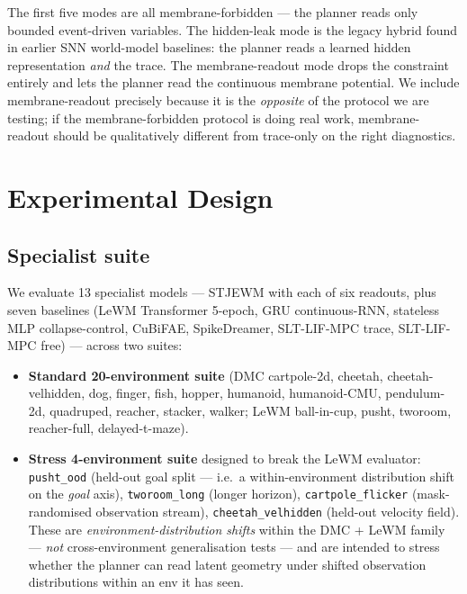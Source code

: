 \documentclass{article}
\begin{document}
The first five modes are all membrane-forbidden --- the planner reads only bounded event-driven variables. The hidden-leak mode is the legacy hybrid found in earlier SNN world-model baselines: the planner reads a learned hidden representation \emph{and} the trace. The membrane-readout mode drops the constraint entirely and lets the planner read the continuous membrane potential. We include membrane-readout precisely because it is the \emph{opposite} of the protocol we are testing; if the membrane-forbidden protocol is doing real work, membrane-readout should be qualitatively different from trace-only on the right diagnostics.

\section{Experimental Design}

\subsection{Specialist suite}

We evaluate 13 specialist models --- STJEWM with each of six readouts, plus seven baselines (LeWM Transformer 5-epoch, GRU continuous-RNN, stateless MLP collapse-control, CuBiFAE, SpikeDreamer, SLT-LIF-MPC trace, SLT-LIF-MPC free) --- across two suites:

\begin{itemize}
\item \textbf{Standard 20-environment suite} (DMC cartpole-2d, cheetah, cheetah-velhidden, dog, finger, fish, hopper, humanoid, humanoid-CMU, pendulum-2d, quadruped, reacher, stacker, walker; LeWM ball-in-cup, pusht, tworoom, reacher-full, delayed-t-maze).
\item \textbf{Stress 4-environment suite} designed to break the LeWM evaluator: \texttt{pusht\_ood} (held-out goal split --- i.e.\ a within-environment distribution shift on the \emph{goal} axis), \texttt{tworoom\_long} (longer horizon), \texttt{cartpole\_flicker} (mask-randomised observation stream), \texttt{cheetah\_velhidden} (held-out velocity field). These are \emph{environment-distribution shifts} within the DMC + LeWM family --- \emph{not} cross-environment generalisation tests --- and are intended to stress whether the planner can read latent geometry under shifted observation distributions within an env it has seen.
\end{itemize}
\end{document}
